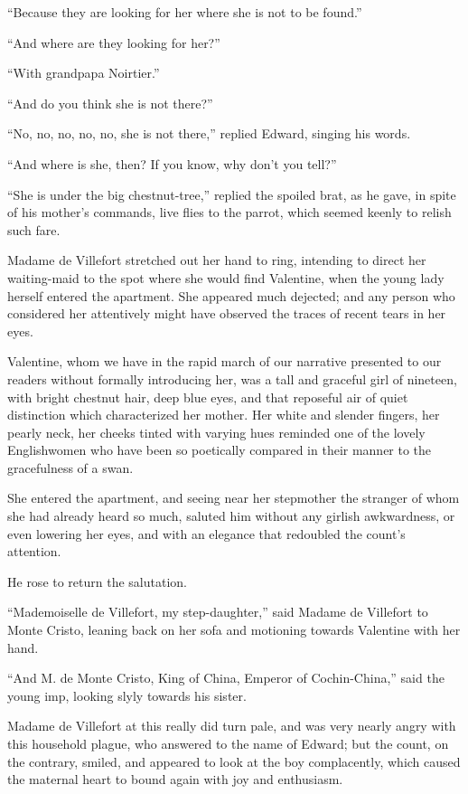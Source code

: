 “Because they are looking for her where she is not to be found.”

“And where are they looking for her?”

“With grandpapa Noirtier.”

“And do you think she is not there?”

“No, no, no, no, no, she is not there,” replied Edward, singing his
words.

“And where is she, then? If you know, why don’t you tell?”

“She is under the big chestnut-tree,” replied the spoiled brat, as he
gave, in spite of his mother’s commands, live flies to the parrot,
which seemed keenly to relish such fare.

Madame de Villefort stretched out her hand to ring, intending to direct
her waiting-maid to the spot where she would find Valentine, when the
young lady herself entered the apartment. She appeared much dejected;
and any person who considered her attentively might have observed the
traces of recent tears in her eyes.

Valentine, whom we have in the rapid march of our narrative presented
to our readers without formally introducing her, was a tall and
graceful girl of nineteen, with bright chestnut hair, deep blue eyes,
and that reposeful air of quiet distinction which characterized her
mother. Her white and slender fingers, her pearly neck, her cheeks
tinted with varying hues reminded one of the lovely Englishwomen who
have been so poetically compared in their manner to the gracefulness of
a swan.

She entered the apartment, and seeing near her stepmother the stranger
of whom she had already heard so much, saluted him without any girlish
awkwardness, or even lowering her eyes, and with an elegance that
redoubled the count’s attention.

He rose to return the salutation.

“Mademoiselle de Villefort, my step-daughter,” said Madame de Villefort
to Monte Cristo, leaning back on her sofa and motioning towards
Valentine with her hand.

“And M. de Monte Cristo, King of China, Emperor of Cochin-China,” said
the young imp, looking slyly towards his sister.

Madame de Villefort at this really did turn pale, and was very nearly
angry with this household plague, who answered to the name of Edward;
but the count, on the contrary, smiled, and appeared to look at the boy
complacently, which caused the maternal heart to bound again with joy
and enthusiasm.

